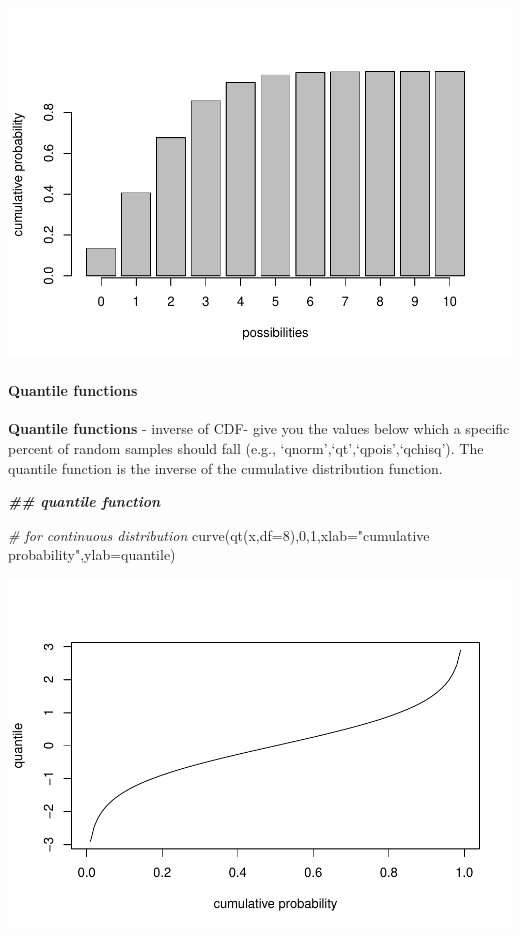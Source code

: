 \documentclass[
]{article}
\newenvironment{Shaded}{\begin{snugshade}}{\end{snugshade}}
\newcommand{\AttributeTok}[1]{\textcolor[rgb]{0.77,0.63,0.00}{#1}}
\newcommand{\CommentTok}[1]{\textcolor[rgb]{0.56,0.35,0.01}{\textit{#1}}}
\newcommand{\DecValTok}[1]{\textcolor[rgb]{0.00,0.00,0.81}{#1}}
\newcommand{\DocumentationTok}[1]{\textcolor[rgb]{0.56,0.35,0.01}{\textbf{\textit{#1}}}}
\newcommand{\FunctionTok}[1]{\textcolor[rgb]{0.00,0.00,0.00}{#1}}
\newcommand{\NormalTok}[1]{#1}
\newcommand{\StringTok}[1]{\textcolor[rgb]{0.31,0.60,0.02}{#1}}
\begin{document}
\includegraphics{LECTURE2_files/figure-latex/unnamed-chunk-18-2.pdf}

\hypertarget{quantile-functions}{%
\paragraph{Quantile functions}\label{quantile-functions}}

\textbf{Quantile functions} - inverse of CDF- give you the values below
which a specific percent of random samples should fall (e.g.,
`qnorm',`qt',`qpois',`qchisq'). The quantile function is the inverse of
the cumulative distribution function.

\begin{Shaded}
\begin{Highlighting}[]
\DocumentationTok{\#\# quantile function  }

    \CommentTok{\# for continuous distribution}
\FunctionTok{curve}\NormalTok{(}\FunctionTok{qt}\NormalTok{(x,}\AttributeTok{df=}\DecValTok{8}\NormalTok{),}\DecValTok{0}\NormalTok{,}\DecValTok{1}\NormalTok{,}\AttributeTok{xlab=}\StringTok{"cumulative probability"}\NormalTok{,}\AttributeTok{ylab=}\StringTok{\textquotesingle{}quantile\textquotesingle{}}\NormalTok{)}
\end{Highlighting}
\end{Shaded}

\includegraphics{LECTURE2_files/figure-latex/unnamed-chunk-19-1.pdf}
\end{document}
